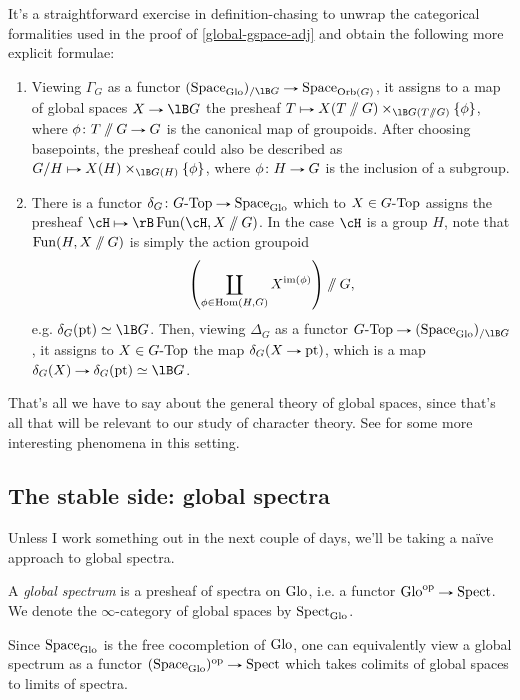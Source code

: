 \begin{remark}
  \label{global-gspace-adj-unwrap}
  It's a straightforward exercise in definition-chasing to unwrap the
  categorical formalities used in the proof of
  \cref{global-gspace-adj} and obtain the following more explicit
  formulae:
  \begin{enumerate}
  \item \label{global-gspace-adj-unwrap-right} Viewing $\Gamma_G$ as a
    functor $(\Space_\Glo)_{/\lB G} \to \Space_{\Orb(G)}$, it assigns
    to a map of global spaces $X \to \lB G$ the presheaf
    $T \mapsto X(T \sslash G) \times_{\lB G(T \sslash G)} \{\phi\}$,
    where $\phi \c T \sslash G \to G$ is the canonical map of
    groupoids. After choosing basepoints, the presheaf could also be
    described as $G/H \mapsto X(H) \times_{\lB G(H)} \{\phi\}$, where
    $\phi \c H \to G$ is the inclusion of a subgroup.
  \item \label{global-gspace-adj-unwrap-left} There is a functor
    $\delta_G \c G\dash\Top \to \Space_\Glo$ which to
    $X \in G\text{-}\mathrm{Top}$ assigns the presheaf
    $\cH \mapsto \rB \Fun(\cH, X \sslash G)$. In the case $\cH$ is a
    group $H$, note that $\operatorname{Fun}(H, X \sslash G)$ is simply the action
    groupoid
    \[
    \left( \coprod_{\phi \in \operatorname{Hom}(H,G)} X^{\operatorname{im}(\phi)} \right) \sslash G,
    \]
    e.g. $\delta_G(\pt) \iso \lB G$. Then, viewing
    $\Delta_G$ as a functor $G\dash\Top \to (\Space_\Glo)_{/\lB G}$,
    it assigns to $X \in G\text{-}\mathrm{Top}$ the map $\delta_G(X \to \pt)$,
    which is a map $\delta_G(X) \to \delta_G(\pt) \iso \lB G$.
  \end{enumerate}
\end{remark}

That's all we have to say about the general theory of global spaces,
since that's all that will be relevant to our study of character
theory. See \cite{rezk-global-cohesion} for some more interesting
phenomena in this setting.


\subsection{The stable side: global spectra}
\label{global-stable}

Unless I work something out in the next couple of days, we'll be
taking a na\"ive approach to global spectra.

\begin{definition}
  \label{global-spectrum}
  A \emph{global spectrum} is a presheaf of spectra on $\mathrm{Glo}$, i.e. a
  functor $\Glo^\op \to \Spect$. We denote the $\infty$-category of
  global spaces by $\mathrm{Spect}_{\mathrm{Glo}}$.
\end{definition}

\begin{remark}
  Since $\mathrm{Space}_{\mathrm{Glo}}$ is the free cocompletion of $\mathrm{Glo}$, one can
  equivalently view a global spectrum as a functor
  $(\Space_\Glo)^\op \to \Spect$ which takes colimits of global spaces
  to limits of spectra.
\end{remark}
